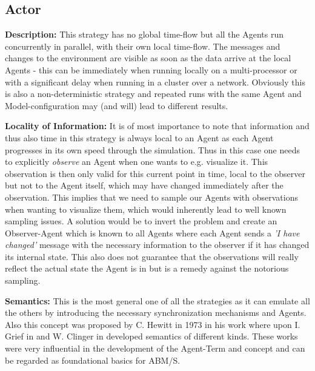 \subsection{Actor}
\textbf{Description:} This strategy has no global time-flow but all the Agents run concurrently in parallel, with their own local time-flow. The messages and changes to the environment are visible as soon as the data arrive at the local Agents - this can be immediately when running locally on a multi-processor or with a significant delay when running in a cluster over a network. Obviously this is also a non-deterministic strategy and repeated runs with the same Agent and Model-configuration may (and will) lead to different results.

\textbf{Locality of Information:} It is of most importance to note that information and thus also time in this strategy is always local to an Agent as each Agent progresses in its own speed through the simulation. Thus in this case one needs to explicitly \textit{observe} an Agent when one wants to e.g. visualize it. This observation is then only valid for this current point in time, local to the observer but not to the Agent itself, which may have changed immediately after the observation. This implies that we need to sample our Agents with observations when wanting to visualize them, which would inherently lead to well known sampling issues. A solution would be to invert the problem and create an Observer-Agent which is known to all Agents where each Agent sends a \textit{'I have changed'} message with the necessary information to the observer if it has changed its internal state. This also does not guarantee that the observations will really reflect the actual state the Agent is in but is a remedy against the notorious sampling. 

\textbf{Semantics:} This is the most general one of all the strategies as it can emulate all the others by introducing the necessary synchronization mechanisms and Agents. Also this concept was proposed by C. Hewitt in 1973 in his work \cite{hewitt_universal_1973} where upon I. Grief in \cite{grief_semantics_1975} and W. Clinger in \cite{clinger_foundations_1981} developed semantics of different kinds. These works were very influential in the development of the Agent-Term and concept and can be regarded as foundational basics for ABM/S.